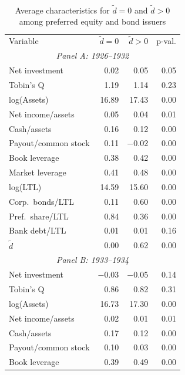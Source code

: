 \begin{table}[p]
\centering
\caption{\\ Average characteristics for $\tilde{d} = 0$ and $\tilde{d} > 0$ among preferred equity and bond issuers} \scriptsize \label{tab:sum_diff_pos}
    \begin{threeparttable}
        \begin{tabular}{lrrr}
            \toprule
            Variable & \ensuremath{\tilde{d}=0} & \ensuremath{\tilde{d}>0} & p-val. \\
            \multicolumn{4}{c}{\textit{Panel A: 1926--1932}} \\
            \midrule
            Net investment & 0.02 & 0.05 & 0.05 \\
            Tobin's Q & 1.19 & 1.14 & 0.23 \\
            log(Assets) & 16.89 & 17.43 & 0.00 \\
            Net income/assets & 0.05 & 0.04 & 0.01 \\
            Cash/assets & 0.16 & 0.12 & 0.00 \\
            Payout/common stock & 0.11 & $-$0.02 & 0.00 \\
            Book leverage & 0.38 & 0.42 & 0.00 \\
            Market leverage & 0.41 & 0.48 & 0.00 \\
            log(LTL) & 14.59 & 15.60 & 0.00 \\
            Corp.\ bonds/LTL & 0.11 & 0.60 & 0.00 \\
            Pref.\ share/LTL & 0.84 & 0.36 & 0.00 \\
            Bank debt/LTL & 0.01 & 0.01 & 0.16 \\
            \ensuremath{\tilde{d}} & 0.00 & 0.62 & 0.00 \\
            \midrule
            \multicolumn{4}{c}{\textit{Panel B: 1933--1934}} \\
            \midrule
            Net investment & $-$0.03 & $-$0.05 & 0.14 \\
            Tobin's Q & 0.86 & 0.82 & 0.31 \\
            log(Assets) & 16.73 & 17.30 & 0.00 \\
            Net income/assets & 0.02 & 0.01 & 0.01 \\
            Cash/assets & 0.17 & 0.12 & 0.00 \\
            Payout/common stock & 0.10 & 0.03 & 0.00 \\
            Book leverage & 0.39 & 0.49 & 0.00 \\

\end{tabular}
\end{threeparttable}
\end{table}
